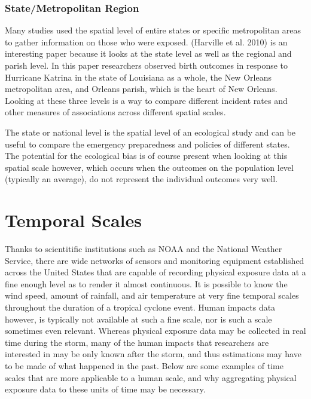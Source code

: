\documentclass[]{article}
\begin{document}
\subsubsection{State/Metropolitan
Region}\label{statemetropolitan-region}

Many studies used the spatial level of entire states or specific
metropolitan areas to gather information on those who were exposed.
(Harville et al. 2010) is an interesting paper because it looks at the
state level as well as the regional and parish level. In this paper
researchers observed birth outcomes in response to Hurricane Katrina in
the state of Louisiana as a whole, the New Orleans metropolitan area,
and Orleans parish, which is the heart of New Orleans. Looking at these
three levels is a way to compare different incident rates and other
measures of associations across different spatial scales.

The state or national level is the spatial level of an ecological study
and can be useful to compare the emergency preparedness and policies of
different states. The potential for the ecological bias is of course
present when looking at this spatial scale however, which occurs when
the outcomes on the population level (typically an average), do not
represent the individual outcomes very well.

\section{Temporal Scales}\label{temporal-scales}

Thanks to scientitific institutions such as NOAA and the National
Weather Service, there are wide networks of sensors and monitoring
equipment established across the United States that are capable of
recording physical exposure data at a fine enough level as to render it
almost continuous. It is possible to know the wind speed, amount of
rainfall, and air temperature at very fine temporal scales throughout
the duration of a tropical cyclone event. Human impacts data however, is
typically not available at such a fine scale, nor is such a scale
sometimes even relevant. Whereas physical exposure data may be collected
in real time during the storm, many of the human impacts that
researchers are interested in may be only known after the storm, and
thus estimations may have to be made of what happened in the past. Below
are some examples of time scales that are more applicable to a human
scale, and why aggregating physical exposure data to these units of time
may be necessary.
\end{document}

